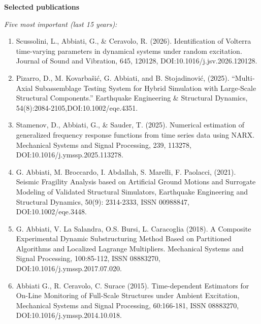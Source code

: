 \documentclass[12pt,a4paper]{article}
\begin{document}
\vspace{0.2cm}
\noindent\textbf{Selected publications}

\noindent\textit{Five most important (last 15 years):}
\begin{enumerate}[nosep]%
  \item Scussolini, L., Abbiati, G., \& Ceravolo, R. (2026). Identification of Volterra time-varying parameters in dynamical systems under random excitation. Journal of Sound and Vibration, 645, 120128, DOI:10.1016/j.jsv.2026.120128.
  \item Pizarro, D., M. Kovarbašić, G. Abbiati, and B. Stojadinović, (2025). “Multi‐Axial Subassemblage Testing System for Hybrid Simulation with Large‐Scale Structural Components.” Earthquake Engineering \& Structural Dynamics, 54(8):2084-2105,DOI:10.1002/eqe.4351.
  \item Stamenov, D., Abbiati, G., \& Sauder, T. (2025). Numerical estimation of generalized frequency response functions from time series data using NARX. Mechanical Systems and Signal Processing, 239, 113278, DOI:10.1016/j.ymssp.2025.113278. 
  \item G. Abbiati, M. Broccardo, I. Abdallah, S. Marelli, F. Paolacci, (2021). Seismic Fragility Analysis based on Artificial Ground Motions and Surrogate Modeling of Validated Structural Simulators, Earthquake Engineering and Structural Dynamics, 50(9): 2314-2333, ISSN 00988847, DOI:10.1002/eqe.3448.
  \item G. Abbiati, V. La Salandra, O.S. Bursi, L. Caracoglia (2018). A Composite Experimental Dynamic Substructuring Method Based on Partitioned Algorithms and Localized Lagrange Multipliers. Mechanical Systems and Signal Processing, 100:85-112, ISSN 08883270, DOI:10.1016/j.ymssp.2017.07.020.
  \item Abbiati G., R. Ceravolo, C. Surace (2015). Time-dependent Estimators for On-Line Monitoring of Full-Scale Structures under Ambient Excitation, Mechanical Systems and Signal Processing, 60:166-181, ISSN 08883270, DOI:10.1016/j.ymssp.2014.10.018.
\end{enumerate}
\end{document}
